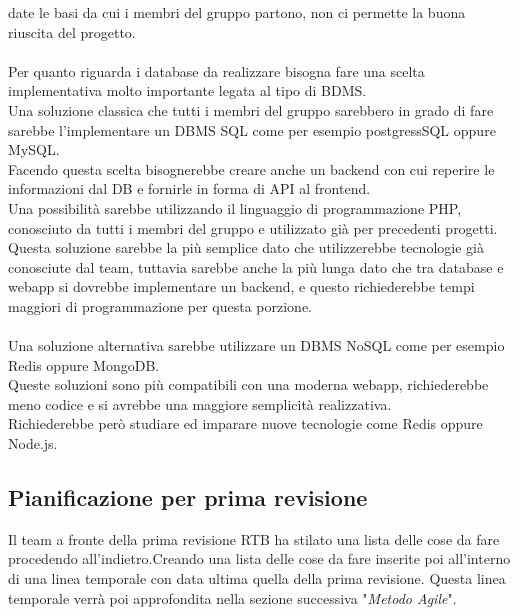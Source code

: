 date le basi da cui i membri del gruppo partono, non ci permette la buona riuscita del progetto.\\\\
Per quanto riguarda i database da realizzare bisogna fare una scelta implementativa molto importante legata al tipo di BDMS.\\
Una soluzione classica che tutti i membri del gruppo sarebbero in grado di fare sarebbe l'implementare un DBMS SQL come per esempio postgressSQL oppure MySQL.\\
Facendo questa scelta bisognerebbe creare anche un backend con cui reperire le informazioni dal DB e fornirle in forma di API al frontend.\\
Una possibilità sarebbe utilizzando il linguaggio di programmazione PHP, conosciuto da tutti i membri del gruppo e utilizzato già per 
precedenti progetti.\\
Questa soluzione sarebbe la più semplice dato che utilizzerebbe tecnologie già conosciute dal team, tuttavia sarebbe anche la più lunga dato che tra database e webapp
si dovrebbe implementare un backend, e questo richiederebbe tempi maggiori di programmazione per questa porzione.\\
\\
Una soluzione alternativa sarebbe utilizzare un DBMS NoSQL come per esempio Redis oppure MongoDB.\\
Queste soluzioni sono più compatibili con una moderna webapp, richiederebbe meno codice e si avrebbe una maggiore semplicità realizzativa.\\
Richiederebbe però studiare ed imparare nuove tecnologie come Redis oppure Node.js.\\

\subsection{Pianificazione per prima revisione}
Il team a fronte della prima revisione RTB ha stilato una lista delle cose da fare procedendo all'indietro.Creando una lista delle cose da fare inserite poi all'interno di una linea temporale con data ultima quella della prima revisione.
Questa linea temporale verrà poi approfondita nella sezione successiva "\textit{Metodo Agile}".



